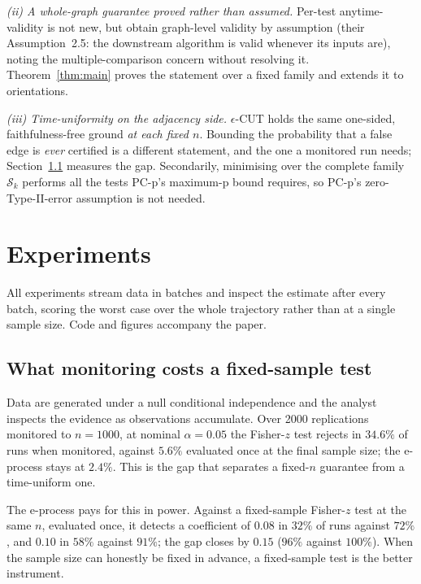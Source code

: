 \documentclass[11pt,a4paper]{article}
\theoremstyle{definition}
\theoremstyle{remark}
\newcommand{\Scal}{\mathcal{S}}
\begin{document}
\emph{(ii) A whole-graph guarantee proved rather than assumed.} Per-test
anytime-validity is not new, but \citet{csillag2025prediction} obtain graph-level
validity by assumption (their Assumption~2.5: the downstream algorithm is valid
whenever its inputs are), noting the multiple-comparison concern without
resolving it. Theorem~\ref{thm:main} proves the statement over a fixed family
and extends it to orientations.

\emph{(iii) Time-uniformity on the adjacency side.} $\epsilon$-CUT holds the
same one-sided, faithfulness-free ground \emph{at each fixed $n$}. Bounding the
probability that a false edge is \emph{ever} certified is a different statement,
and the one a monitored run needs; Section~\ref{sec:exp-calibration} measures the
gap. Secondarily, minimising over the complete family $\Scal_k$ performs all the
tests PC-p's maximum-p bound requires, so PC-p's zero-Type-II-error assumption
is not needed.

\section{Experiments}
\label{sec:experiments}

All experiments stream data in batches and inspect the estimate after every
batch, scoring the worst case over the whole trajectory rather than at a single
sample size. Code and figures accompany the paper.

\subsection{What monitoring costs a fixed-sample test}
\label{sec:exp-calibration}

Data are generated under a null conditional independence and the analyst
inspects the evidence as observations accumulate. Over 2000 replications
monitored to $n = 1000$, at nominal $\alpha = 0.05$ the Fisher-$z$ test rejects
in $34.6\%$ of runs when monitored, against $5.6\%$ evaluated once at the final
sample size; the e-process stays at $2.4\%$. This is the gap that separates a
fixed-$n$ guarantee from a time-uniform one.

The e-process pays for this in power. Against a fixed-sample Fisher-$z$ test at
the same $n$, evaluated once, it detects a coefficient of $0.08$ in $32\%$ of
runs against $72\%$, and $0.10$ in $58\%$ against $91\%$; the gap closes by
$0.15$ ($96\%$ against $100\%$). When the sample size can honestly be fixed in
advance, a fixed-sample test is the better instrument.
\end{document}
